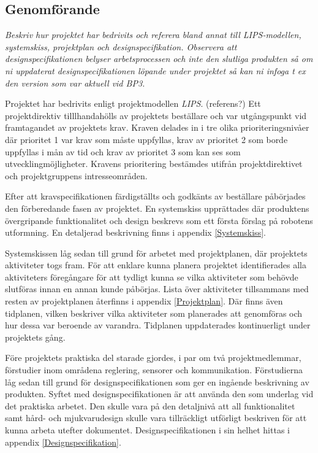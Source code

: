 \documentclass[11pt]{article}
\begin{document}
\begin{flushleft}
\pagebreak

\section{Genomförande}

\textit{Beskriv hur projektet har bedrivits och referera bland annat till LIPS-modellen, systemskiss, projektplan och designspecifikation. Observera att designspecifikationen belyser arbetsprocessen och inte den slutliga produkten så om ni uppdaterat designspecifikationen löpande under projektet så kan ni infoga t ex den version som var aktuell vid BP3.}

Projektet har bedrivits enligt projektmodellen \textit{LIPS}. (referens?) Ett projektdirektiv tilllhandahölls av projektets beställare och var utgångspunkt vid framtagandet av projektets krav. Kraven delades in i tre olika prioriteringsnivåer där prioritet 1 var krav som måste uppfyllas, krav av prioritet 2 som borde uppfyllas i mån av tid och krav av prioritet 3 som kan ses som utvecklingmöjligheter. Kravens prioritering bestämdes utifrån projektdirektivet och projektgruppens intresseområden. 

Efter att kravspecifikationen färdigställts och godkänts av beställare påbörjades den förberedande fasen av projektet. En systemskiss upprättades där produktens övergripande funktionalitet och design beskrevs som ett första förslag på robotens utformning. En detaljerad beskrivning finns i appendix \ref{Systemskiss}. 

Systemskissen låg sedan till grund för arbetet med projektplanen, där projektets aktiviteter togs fram. För att enklare kunna planera projektet identifierades alla aktiviteters föregångare för att tydligt kunna se vilka aktiviteter som behövde slutföras innan en annan kunde påbörjas. Lista över aktiviteter tillsammans med resten av projektplanen återfinns i appendix \ref{Projektplan}. Där finns även tidplanen, vilken beskriver vilka aktiviteter som planerades att genomföras och hur dessa var beroende av varandra. Tidplanen uppdaterades kontinuerligt under projektets gång.

Före projektets praktiska del starade gjordes, i par om två projektmedlemmar, förstudier inom områdena reglering, sensorer och kommunikation. Förstudierna låg sedan till grund för designspecifikationen som ger en ingående beskrivning av produkten. Syftet med designspecifikationen är att använda den som underlag vid det praktiska arbetet. Den skulle vara på den detaljnivå att all funktionalitet samt hård- och mjukvarudesign skulle vara tillräckligt utförligt beskriven för att kunna arbeta utefter dokumentet. Designspecifikationen i sin helhet hittas i appendix \ref{Designspecifikation}. 


\end{flushleft}
\end{document}

